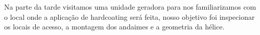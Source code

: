 \documentclass[a4paper,11pt,oneside,openany,brazilian,version=last,draft=false,]{main}
\begin{document}
\begin{twocolumn}
% 


Na parte da tarde visitamos uma unidade geradora para nos familiarizamos com o
local onde a aplicação de hardcoating será feita, nosso objetivo foi inspecionar
os locais de acesso, a montagem dos andaimes e a geometria da hélice.



\end{twocolumn}
\end{document}
